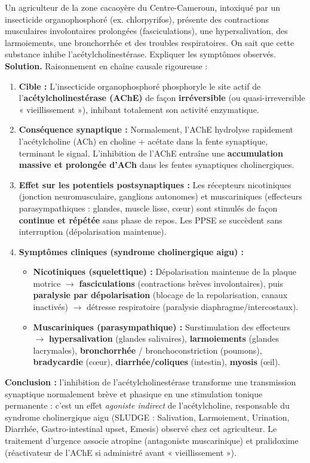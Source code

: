 \documentclass[11pt]{article}
\begin{document}
\begin{exoresolu}
Un agriculteur de la zone cacaoyère du Centre-Cameroun, intoxiqué par un insecticide organophosphoré (ex. chlorpyrifos), présente des contractions musculaires involontaires prolongées (fasciculations), une hypersalivation, des larmoiements, une bronchorrhée et des troubles respiratoires. On sait que cette substance inhibe l'acétylcholinestérase. Expliquer les symptômes observés.
\tcblower
\textbf{Solution.} Raisonnement en chaîne causale rigoureuse :
\begin{enumerate}
\item \textbf{Cible :} L'insecticide organophosphoré phosphoryle le site actif de l'\textbf{acétylcholinestérase (AChE)} de façon \textbf{irréversible} (ou quasi-irreversible « vieillissement »), inhibant totalement son activité enzymatique.
\item \textbf{Conséquence synaptique :} Normalement, l'AChE hydrolyse rapidement l'acétylcholine (ACh) en choline + acétate dans la fente synaptique, terminant le signal. L'inhibition de l'AChE entraîne une \textbf{accumulation massive et prolongée d'ACh} dans les fentes synaptiques cholinergiques.
\item \textbf{Effet sur les potentiels postsynaptiques :} Les récepteurs nicotiniques (jonction neuromusculaire, ganglions autonomes) et muscariniques (effecteurs parasympathiques : glandes, muscle lisse, cœur) sont stimulés de façon \textbf{continue et répétée} sans phase de repos. Les PPSE se succèdent sans interruption (dépolarisation maintenue).
\item \textbf{Symptômes cliniques (syndrome cholinergique aigu) :}
\begin{itemize}
\item \textbf{Nicotiniques (squelettique) :} Dépolarisation maintenue de la plaque motrice $\rightarrow$ \textbf{fasciculations} (contractions brèves involontaires), puis \textbf{paralysie par dépolarisation} (blocage de la repolarisation, canaux  inactivés) $\rightarrow$ détresse respiratoire (paralysie diaphragme/intercostaux).
\item \textbf{Muscariniques (parasympathique) :} Surstimulation des effecteurs $\rightarrow$ \textbf{hypersalivation} (glandes salivaires), \textbf{larmoiements} (glandes lacrymales), \textbf{bronchorrhée} / bronchoconstriction (poumons), \textbf{bradycardie} (cœur), \textbf{diarrhée/coliques} (intestin), \textbf{myosis} (œil).
\end{itemize}
\end{enumerate}
\textbf{Conclusion :} l'inhibition de l'acétylcholinestérase transforme une transmission synaptique normalement brève et phasique en une stimulation tonique permanente : c'est un effet \emph{agoniste indirect} de l'acétylcholine, responsable du syndrome cholinergique aigu (SLUDGE : Salivation, Larmoiement, Urination, Diarrhée, Gastro-intestinal upset, Emesis) observé chez cet agriculteur. Le traitement d'urgence associe atropine (antagoniste muscarinique) et pralidoxime (réactivateur de l'AChE si administré avant « vieillissement »).
\end{exoresolu}
\end{document}

